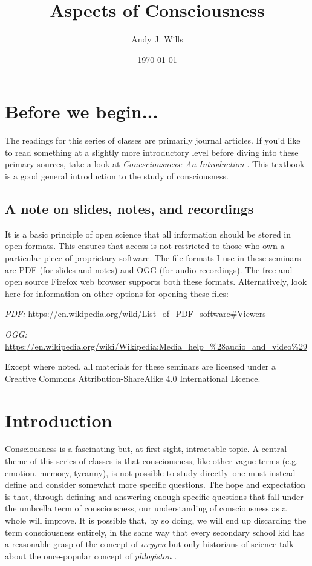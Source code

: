 \documentclass[11pt]{article}
\begin{document}
\title{Aspects of Consciousness}
\author{Andy J. Wills}
\date{\today}
\maketitle

\section{Before we begin...}

The readings for this series of classes are primarily journal
articles. If you'd like to read something at a slightly more
introductory level before diving into these primary sources, take a
look at \emph{Concsciousness: An Introduction}
\cite{blackmore2010}. This textbook is a good general introduction to
the study of consciousness.

\subsection{A note on slides, notes, and recordings}

It is a basic principle of open science that all information should be
stored in open formats. This ensures that access is not restricted to
those who own a particular piece of proprietary software. The file
formats I use in these seminars are PDF (for slides and notes) and OGG
(for audio recordings). The free and open source Firefox web browser
supports both these formats. Alternatively, look here for information
on other options for opening these files:

\emph{PDF:} \url{https://en.wikipedia.org/wiki/List_of_PDF_software#Viewers}

\emph{OGG:} \url{https://en.wikipedia.org/wiki/Wikipedia:Media_help_%28audio_and_video%29}

Except where noted, all materials for these seminars are licensed
under a Creative Commons Attribution-ShareAlike 4.0 International
Licence.

\section{Introduction}

Consciousness is a fascinating but, at first sight, intractable
topic. A central theme of this series of classes is that
consciousness, like other vague terms (e.g. emotion, memory, tyranny),
is not possible to study directly--one must instead define and
consider somewhat more specific questions. The hope and expectation is
that, through defining and answering enough specific questions that
fall under the umbrella term of consciousness, our understanding of
consciousness as a whole will improve.  It is possible that, by so
doing, we will end up discarding the term consciousness entirely, in
the same way that every secondary school kid has a reasonable grasp of
the concept of \emph{oxygen} but only historians of science talk about
the once-popular concept of \emph{phlogiston} \cite{phlogiston}.
\end{document}
